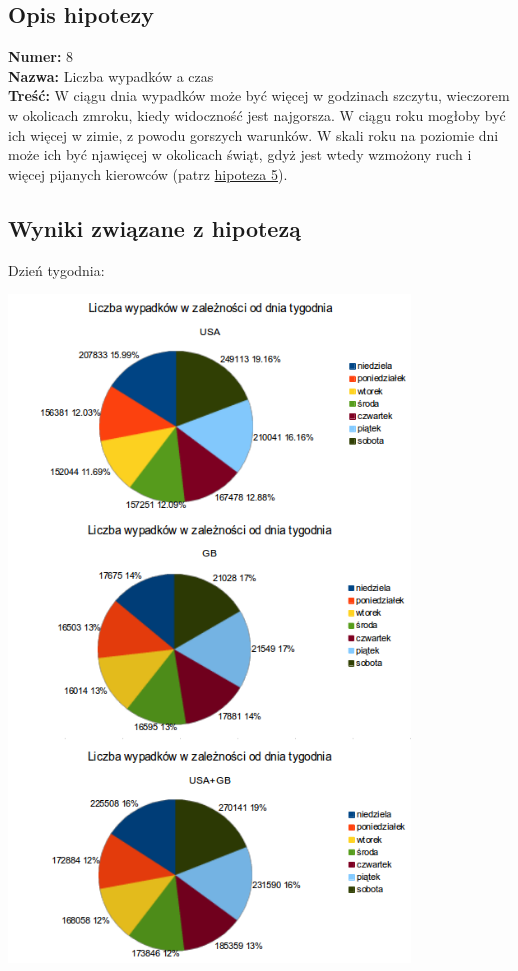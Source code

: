 \subsection{Opis hipotezy}\label{opis-hipotezy}

\textbf{Numer:} 8\\\textbf{Nazwa:} Liczba wypadków a
czas\\\textbf{Treść:} W ciągu dnia wypadków może być więcej w godzinach
szczytu, wieczorem w okolicach zmroku, kiedy widoczność jest najgorsza.
W ciągu roku mogłoby być ich więcej w zimie, z powodu gorszych warunków.
W skali roku na poziomie dni może ich być njawięcej w okolicach świąt,
gdyż jest wtedy wzmożony ruch i więcej pijanych kierowców (patrz
\href{Hipoteza-5}{hipoteza 5}).

\subsection{Wyniki związane z
hipotezą}\label{wyniki-zwiazane-z-hipoteza}

Dzień
tygodnia:\\\centerline{\includegraphics[width=0.8\textwidth]{images/statistics/day_of_week.png}}

